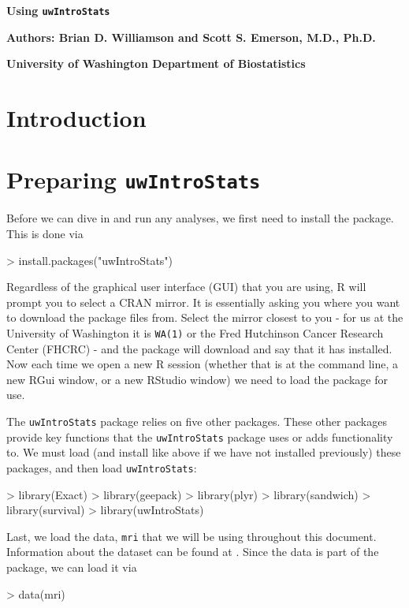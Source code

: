 \documentclass[landscape]{article}
\renewenvironment{Schunk}{\vspace{\topsep}}{\vspace{\topsep}}
\begin{document}

\centerline{\large{\textbf{Using \texttt{uwIntroStats}}}}
\centerline{\textbf{Authors: Brian D. Williamson and Scott S. Emerson, M.D., Ph.D.}}
\centerline{\textbf{University of Washington Department of Biostatistics}}
\tableofcontents
\newpage
\section{Introduction}

\section{Preparing \texttt{uwIntroStats}}


\indent Before we can dive in and run any analyses, we first need to install the package. This is done via
\begin{Schunk}
\begin{Sinput}
> install.packages("uwIntroStats")
\end{Sinput}
\end{Schunk}


Regardless of the graphical user interface (GUI) that you are using, R will prompt you to select a CRAN mirror. It is essentially asking you where you want to download the package files from. Select the mirror closest to you - for us at the University of Washington it is \texttt{WA(1)} or the Fred Hutchinson Cancer Research Center (FHCRC) - and the package will download and say that it has installed. Now each time we open a new R session (whether that is at the command line, a new RGui window, or a new RStudio window) we need to load the package for use. 

The \texttt{uwIntroStats} package relies on five other packages. These other packages provide key functions that the \texttt{uwIntroStats} package uses or adds functionality to. We must load (and install like above if we have not installed previously) these packages, and then load \texttt{uwIntroStats}:
\begin{Schunk}
\begin{Sinput}
> library(Exact)
> library(geepack)
> library(plyr)
> library(sandwich)
> library(survival)
> library(uwIntroStats)
\end{Sinput}
\end{Schunk}

Last, we load the data, \texttt{mri} that we will be using throughout this document. Information about the dataset can be found at . Since the data is part of the package, we can load it via
\begin{Schunk}
\begin{Sinput}
> data(mri)
\end{Sinput}
\end{Schunk}
\end{document}

